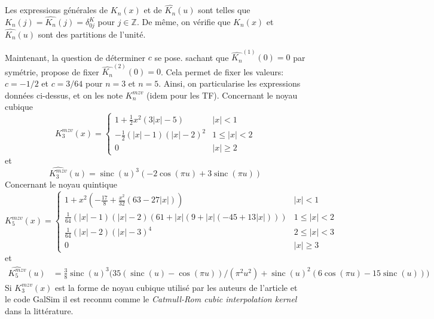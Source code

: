 \documentclass[11pt,twoside]{article}
\DeclareMathOperator{\sinc}{sinc}
\begin{document}
Les expressions générales de $K_n(x)$ et de $\hat{K_n}(u)$ sont telles que $K_n(j)=\hat{K_n}(j)=\delta^K_{0j}$ pour $j\in\mathbb{Z}$. De même, on vérifie que $K_n(x)$ et $\hat{K_n}(u)$ sont des partitions de l'unité.

Maintenant, la question de déterminer $c$ se pose. \cite{Meijering1999} sachant que  $\hat{K_n}^{(1)}(0) = 0$ par symétrie, propose de fixer $\hat{K_n}^{(2)}(0) = 0$. Cela permet de fixer les valeurs: $c=-1/2$ et $c=3/64$ pour $n=3$ et $n=5$. Ainsi, on particularise les expressions données ci-dessus, et on les note $K^{mzv}_n$ (idem pour les TF). Concernant le noyau cubique
\begin{equation}
K^{mzv}_3(x) = \begin{cases}
1 +\frac{1}{2}x^2(3|x|-5) & |x|< 1 \\
-\frac{1}{2}(|x|-1)(|x|-2)^2& 1\leq |x|<2 \\
0 & |x| \geq 2
\end{cases}
\end{equation}
et
\begin{equation}
\widehat{K^{mzv}_3}(u) = \sinc(u)^3 (-2 \cos(\pi u) + 3 \sinc(\pi u))
\end{equation}
 Concernant le noyau quintique
\begin{equation}
K^{mzv}_5(x) = \begin{cases}
1 + x^2\left(-\frac{17}{8}+\frac{x^2}{32}\left(63- 27|x|\right) \right) & |x|< 1 \\
\frac{1}{64}(|x|-1)(|x|-2)(61+|x|(9+|x|(-45+13|x|)))& 1\leq |x|<2 \\
\frac{1}{64}(|x|-2)(|x|-3)^4 & 2\leq |x|<3 \\
0 & |x| \geq 3
\end{cases}
\end{equation}
et
\begin{align}
\widehat{K^{mzv}_5}(u) &=\frac{3}{8} \sinc(u)^3 \Big(35 (\sinc(u) - 
       \cos(\pi u) )/ (\pi^2 u^2) + 
   \sinc(u)^2 (6 \cos(\pi u) - 15 \sinc(u))\Big)
\end{align}
Si $K^{mzv}_3(x)$ est la forme  de noyau cubique utilisé par les auteurs de l'article \cite{2014PASP..126..287B} et le code \textsf{GalSim} il est reconnu comme le \textit{Catmull-Rom cubic interpolation kernel} dans la littérature. 
\end{document}
